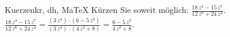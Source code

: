\begin{MAufgabe}{Kuerzen}{kr, dh, MaTeX}
K\"urzen Sie soweit m\"oglich: $\frac{18\, z^4 - 15\, z^7}{12\, z^6 + 24\, z^4}$.\\ 
\ifLsg\MLoesung
\quad $\frac{18\, z^4 - 15\, z^7}{12\, z^6 + 24\, z^4}=\frac{(3\, z^4)\cdot(6 - 5\, z^3)}{(3\, z^4)\cdot(4\, z^2 + 8)}=\frac{6 - 5\, z^3}{4\, z^2 + 8}$.\else\relax\fi
 \end{MAufgabe}